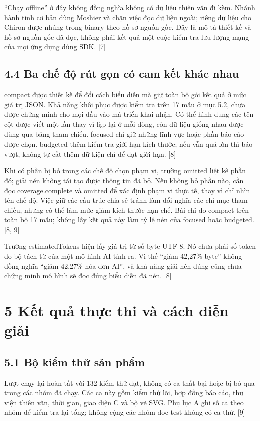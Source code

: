 \documentclass[11pt,a4paper]{article}
\begin{document}
“Chạy offline” ở đây không đồng nghĩa không có dữ liệu thiên văn đi kèm. Nhánh hành tinh cơ bản dùng Moshier và chặn việc đọc dữ liệu ngoài; riêng dữ liệu cho Chiron được nhúng trong binary theo hồ sơ nguồn gốc. Đây là mô tả thiết kế và hồ sơ nguồn gốc đã đọc, không phải kết quả một cuộc kiểm tra lưu lượng mạng của mọi ứng dụng dùng SDK. [7]


\subsection*{4.4 Ba chế độ rút gọn có cam kết khác nhau}
compact được thiết kế để đổi cách biểu diễn mà giữ toàn bộ gói kết quả ở mức giá trị JSON. Khả năng khôi phục được kiểm tra trên 17 mẫu ở mục 5.2, chưa được chứng minh cho mọi đầu vào mà triển khai nhận. Có thể hình dung các tên cột được viết một lần thay vì lặp lại ở mỗi dòng, còn dữ liệu giống nhau được dùng qua bảng tham chiếu. focused chỉ giữ những lĩnh vực hoặc phần báo cáo được chọn. budgeted thêm kiểm tra giới hạn kích thước; nếu vẫn quá lớn thì báo vượt, không tự cắt thêm dữ kiện chỉ để đạt giới hạn. [8]


Khi có phần bị bỏ trong các chế độ chọn phạm vi, trường omitted liệt kê phần đó; giải nén không tái tạo được thông tin đã bỏ. Nếu không bỏ phần nào, cần đọc coverage.complete và omitted để xác định phạm vi thực tế, thay vì chỉ nhìn tên chế độ. Việc giữ các cấu trúc chia sẻ tránh làm đổi nghĩa các chỉ mục tham chiếu, nhưng có thể làm mức giảm kích thước hạn chế. Bài chỉ đo compact trên toàn bộ 17 mẫu; không lấy kết quả này làm tỷ lệ nén của focused hoặc budgeted. [8, 9]


Trường estimatedTokens hiện lấy giá trị từ số byte UTF-8. Nó chưa phải số token do bộ tách từ của một mô hình AI tính ra. Vì thế “giảm 42,27\% byte” không đồng nghĩa “giảm 42,27\% hóa đơn AI”, và khả năng giải nén đúng cũng chưa chứng minh mô hình sẽ đọc đúng biểu diễn đã nén. [8]


\section*{5 Kết quả thực thi và cách diễn giải}
\subsection*{5.1 Bộ kiểm thử sản phẩm}
Lượt chạy lại hoàn tất với 132 kiểm thử đạt, không có ca thất bại hoặc bị bỏ qua trong các nhóm đã chạy. Các ca này gồm kiểm thử lõi, hợp đồng báo cáo, thư viện thiên văn, thời gian, giao diện C và bộ vẽ SVG. Phụ lục A ghi số ca theo nhóm để kiểm tra lại tổng; không cộng các nhóm doc-test không có ca thử. [9]
\end{document}
